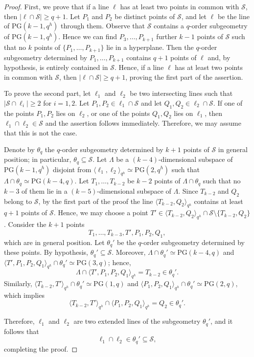 \documentclass[10pt,a4paper]{amsart}
\def\PG{\mathrm{PG}}
\def\cS{\mathcal S}
\begin{document}
\begin{proof}
First, we prove that if a line $\ell$ has at least two points in common with 
$\mathcal S$, then $|\ell \cap \mathcal S| \ge q+1$. 
Let $P_1$ and $P_2$ be distinct points of $\mathcal S$, and let $\ell$ be the line 
of $\PG(k-1,q^h)$ through them. Observe that $\cS$ contains a $q$-order subgeometry of $\PG(k-1, q^h)$. Hence we can find  $P_3,\dots,P_{k+1}$ further $k-1$ points 
of $\mathcal S$ such that no $k$ points of $\{P_1,\dots,P_{k+1}\}$ lie in a 
hyperplane. Then the $q$-order subgeometry determined by $P_1,\dots,P_{k+1}$ 
contains $q+1$ points of $\ell$ and, by hypothesis, is entirely contained in 
$\mathcal S$. Hence, if a line $\ell$ has at least two points in common with 
$\mathcal S$, then $|\ell \cap \mathcal S| \ge q+1$, proving the first part of 
the assertion.

\noindent To prove the second part, let $\ell_1$ and $\ell_2$ be two intersecting lines such 
that $|\mathcal S \cap \ell_i| \ge 2$ for $i=1,2$. Let $P_1,P_2 \in \ell_1 \cap 
\mathcal S$ and let $Q_1,Q_2 \in \ell_2 \cap \mathcal S$. If one of the points 
$P_1,P_2$ lies on $\ell_2$, or one of the points $Q_1,Q_2$ lies on $\ell_1$, then 
$\ell_1 \cap \ell_2 \in \mathcal S$ and the assertion follows immediately. 
Therefore, we may assume that this is not the case.

\noindent Denote by $\theta_q$ the $q$-order subgeometry determined by $k+1$ points of 
$\mathcal S$ in general position; in particular, $\theta_q \subseteq \mathcal S$. 
Let $\Lambda$ be a $(k-4)$-dimensional subspace of $\PG(k-1,q^h)$ disjoint from 
$\langle \ell_1,\ell_2 \rangle_{q^h} \simeq \PG(2,q^h)$ such that 
$\Lambda \cap \theta_q \simeq \PG(k-4,q)$. Let $T_1,\dots,T_{k-2}$ be $k-2$ points 
of $\Lambda \cap \theta_q$ such that no $k-3$ of them lie in a $(k-5)$-dimensional subspace of 
$\Lambda$. Since $T_{k-2}$ and $Q_2$ belong to $\mathcal S$, by the first part of the proof 
the line $\langle T_{k-2},Q_2 \rangle_{q^h}$ contains at least $q+1$ points of 
$\mathcal S$. Hence, we may choose a point 
$T' \in \langle T_{k-2},Q_2 \rangle_{q^h} \cap \mathcal S \setminus 
\{T_{k-2},Q_2\}$. Consider the $k+1$ points
\[
T_1,\dots,T_{k-3},T',P_1,P_2,Q_1,
\]
which are in general position. Let $\theta_q'$ be the $q$-order subgeometry 
determined by these points. By hypothesis, $\theta_q' \subseteq \mathcal S$. Moreover, $\Lambda \cap \theta_q' \simeq \PG(k-4,q)$ and 
$\langle T',P_1,P_2,Q_1 \rangle_{q^h} \cap \theta_q' \simeq \PG(3,q)$; hence,
\[
\Lambda \cap \langle T',P_1,P_2,Q_1 \rangle_{q^h} = T_{k-2} \in \theta_q'.
\]
Similarly, 
$\langle T_{k-2},T' \rangle_{q^h} \cap \theta_q' \simeq \PG(1,q)$ and 
$\langle P_1,P_2,Q_1 \rangle_{q^h} \cap \theta_q' \simeq \PG(2,q)$, which implies
\[
\langle T_{k-2},T' \rangle_{q^h} \cap 
\langle P_1,P_2,Q_1 \rangle_{q^h} = Q_2 \in \theta_q'.
\]

\noindent Therefore, $\ell_1$ and $\ell_2$ are two extended lines of the subgeometry 
$\theta_q'$, and it follows that \[\ell_1 \cap \ell_2 \in \theta_q' \subseteq 
\mathcal S,\] completing the proof.
\end{proof}
\end{document}
